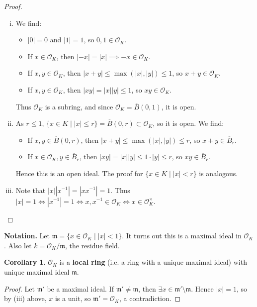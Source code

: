 \documentclass{article}
\theoremstyle{definition}
\newtheorem{cor}[theorem]{Corollary}
\begin{document}
\begin{proof}
    \begin{enumerate}[(i)]
        \item We find:
        \begin{itemize}
            \item $|0|=0$ and $|1|=1$, so $0,1 \in \mathcal{O}_K$.
            \item If $x \in \mathcal{O}_K$, then $|-x|=|x| \implies -x \in \mathcal{O}_K$. 
            \item If $x,y \in \mathcal{O}_K$, then $|x+y|\le \max(|x|,|y|)\le 1$, so $x+y \in \mathcal{O}_K$. 
            \item If $x,y \in \mathcal{O}_K$, then $|xy| = |x||y| \le 1$, so $xy \in \mathcal{O}_K$.
        \end{itemize}
        Thus $\mathcal{O}_K$ is a subring, and since $\mathcal{O}_K = \overline{B}(0,1)$, it is open.
        \item As $r\le 1$, $\{x \in K \mid |x|\le r\} = \overline{B}(0,r) \subset \mathcal{O}_K$, so it is open. We find:
        \begin{itemize}
            \item If $x, y \in \overline{B}(0,r)$, then $|x+y|\le \max(|x|,|y|) \le r$, so $x+y \in \overline{B}_r$.
            \item If $x \in \mathcal{O}_K, y \in \overline{B}_r$, then $|xy|=|x||y|\le 1 \cdot |y|\le r$, so $xy \in \overline{B}_r$.
        \end{itemize}
        Hence this is an open ideal. The proof for $\{x \in K \mid |x|< r\}$ is analogous.
        \item Note that $|x||x^{-1}|= |x x^{-1}| = 1$. Thus $|x| = 1 \iff |x^{-1}| = 1 \iff x,x^{-1} \in \mathcal{O}_K \iff x \in \mathcal{O}_K^\times$.
    \end{enumerate}
\end{proof}

\textbf{Notation.} Let $\mathfrak{m} = \{x \in \mathcal{O}_K \mid |x|<1\}$. It turns out this is a maximal ideal in $\mathcal{O}_K$. Also let $k = \mathcal{O}_K/\mathfrak{m}$, the residue field. 

\begin{cor}
    $\mathcal{O}_K$ is a \textbf{local ring} (i.e. a ring with a unique maximal ideal) with unique maximal ideal $\mathfrak{m}$.
\end{cor}
\begin{proof}
    Let $\mathfrak{m'}$ be a maximal ideal. If $\mathfrak{m'} \neq \mathfrak{m}$, then $\exists x \in \mathfrak{m'}\setminus \mathfrak{m}$. Hence $|x|= 1$, so by (iii) above, $x$ is a unit, so $\mathfrak{m'}=\mathcal{O}_K$, a contradiction.
\end{proof}
\end{document}
